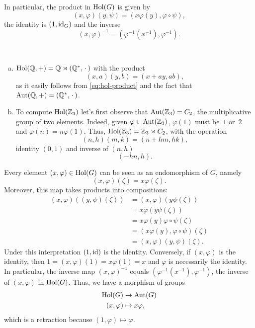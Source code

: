 \begin{rem}
    In particular, the product in $\operatorname{Hol}(G)$ is given by
    \begin{equation}\label{eq:hol-product}
        (x,\varphi)(y,\psi) = (x\varphi(y),\varphi\circ\psi),
    \end{equation}
    the identity is $(1,\operatorname{id}_G)$ and the inverse
    \begin{equation}\label{eq:hol-inverse}
        (x,\varphi)^{-1} = (\varphi^{-1}(x^{-1}),\varphi^{-1}).
    \end{equation}
\end{rem}

\begin{xmpls}${}$
    \begin{enumerate}[a),font=\upshape]
        \item $\operatorname{Hol}(\mathbb{Q},+)=\mathbb{Q}\rtimes(\mathbb{Q}^*,\,\cdot\,)$ with the product
        $$
            (x,a)(y,b)=(x+ay,ab),
        $$
        as it easily follows from \eqref{eq:hol-product} and the fact that ${\rm Aut}(\mathbb{Q},+)=(\mathbb{Q}^*,\,\cdot\,)$.

        \item To compute $\operatorname{Hol}(\mathbb{Z}_3)$ let's first observe that ${\rm Aut}(\mathbb{Z}_3)=C_2$, the multiplicative group of two elements. Indeed, given $\varphi\in{\rm Aut}(\mathbb{Z}_3)$, $\varphi(1)$ must be~$1$ or~$2$ and $\varphi(n)=n\varphi(1)$. Thus, $\operatorname{Hol}(\mathbb{Z}_3)=\mathbb{Z}_3\rtimes C_2$, with the operation
        $$
            (n,h)(m,k) = (n+hm, hk),
        $$
        identity $(0,1)$ and inverse of $(n,h)$
        $$
            (-hn,h).
        $$
    \end{enumerate}
\end{xmpls}

\begin{rem}\label{rem:Hol(G)}
    Every element $(x,\varphi)\in\operatorname{Hol}(G)$ can be seen as an endomorphism of $G$, namely
    $$
        (x,\varphi)(\zeta)=x\varphi(\zeta).
    $$
    Moreover, this map takes products into compositions:
    \begin{align*}
        (x,\varphi)((y,\psi)(\zeta))
            &= (x,\varphi)(y\psi(\zeta))\\
            &= x\varphi(y\psi(\zeta))\\
            &= x\varphi(y)\varphi\circ\psi(\zeta)\\
            &= (x\varphi(y),\varphi\circ\psi)(\zeta)\\
            &= (x,\varphi)(y,\psi)(\zeta).
    \end{align*}
    Under this interpretation $(1,\operatorname{id})$ is the identity. Conversely, if $(x,\varphi)$ is the identity, then $1=(x,\varphi)(1)=x\varphi(1)=x$ and $\varphi$ is necessarily the identity. In particular, the inverse map $(x,\varphi)^{-1}$ equals $(\varphi^{-1}(x^{-1}),\varphi^{-1})$, the inverse of $(x,\varphi)$ in $\operatorname{Hol}(G)$. Thus, we have a morphism of groups
    \begin{align*}
        \operatorname{Hol}(G)&\to{\rm Aut}(G)\\
        (x,\varphi)&\mapsto x\varphi,
    \end{align*}
    which is a retraction because $(1,\varphi)\mapsto\varphi$.
\end{rem}


